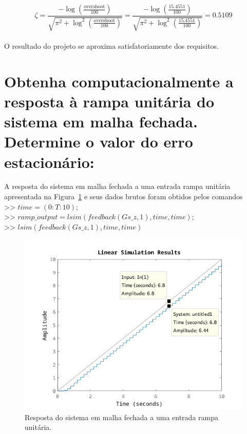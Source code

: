 \documentclass{article}
\begin{document}
{        \[ \zeta = \frac{-\log\left( \frac{\text{overshoot}}{100} \right)}{ \sqrt{ \pi^2 + \log^2\left( \frac{\text{overshoot}}{100} \right) } }
            = \frac{-\log\left( \frac{15.4551}{100} \right)}{ \sqrt{ \pi^2 + \log^2\left( \frac{15.4551}{100} \right) } }
            = 0.5109 \]\\

        {O resultado do projeto se aproxima satisfatoriamente dos requisitos.}


    \section{Obtenha computacionalmente a resposta à rampa unitária do sistema
        em malha fechada. Determine o valor do erro estacionário:}

        {A resposta do sistema em malha fechada a uma entrada rampa unitária
            apresentada na Figura~\ref{fig:q2_ramp_response} e seus dados brutos
            foram obtidos pelos comandos\\
        >> $ time = (0:T:10); $\\
        >> $ ramp\_output = lsim(feedback(Gs\_z, 1), time, time); $\\
        >> $ lsim(feedback(Gs\_z, 1), time, time) $ }\\

        \begin{figure}[H]
           \centering
                \includegraphics[width=1\linewidth]{images/q2_ramp_response.png}
                \caption{Resposta do sistema em malha fechada a uma entrada rampa unitária.}
                \label{fig:q2_ramp_response}
        \end{figure}

}
\end{document}
